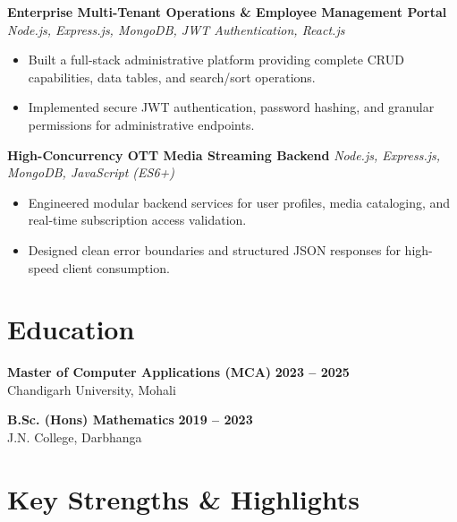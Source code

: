 \documentclass[a4paper,10pt]{article}
\begin{document}
\textbf{Enterprise Multi-Tenant Operations \& Employee Management Portal}
\hfill
\textit{Node.js, Express.js, MongoDB, JWT Authentication, React.js}

\begin{itemize}

    \item Built a full-stack administrative platform providing complete CRUD capabilities, data tables, and search/sort operations.

    \item Implemented secure JWT authentication, password hashing, and granular permissions for administrative endpoints.

\end{itemize}


\textbf{High-Concurrency OTT Media Streaming Backend}
\hfill
\textit{Node.js, Express.js, MongoDB, JavaScript (ES6+)}

\begin{itemize}

    \item Engineered modular backend services for user profiles, media cataloging, and real-time subscription access validation.

    \item Designed clean error boundaries and structured JSON responses for high-speed client consumption.

\end{itemize}

\section*{Education}

\textbf{Master of Computer Applications (MCA)}
\hfill
\textbf{2023 -- 2025}
\\
Chandigarh University, Mohali

\vspace{3pt}

\textbf{B.Sc. (Hons) Mathematics}
\hfill
\textbf{2019 -- 2023}
\\
J.N. College, Darbhanga

\section*{Key Strengths \& Highlights}
\end{document}
